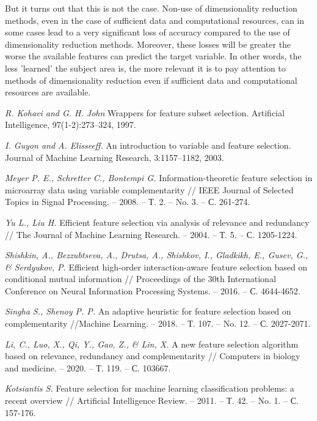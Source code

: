 \documentclass[12pt]{a&t}
\begin{document}
But it turns out that this is not the case. Non-use of dimensionality reduction methods, even in the case of sufficient data and computational resources, can in some cases lead to a very significant loss of accuracy compared to the use of dimensionality reduction methods. Moreover, these losses will be greater the worse the available features can predict the target variable. In other words, the less 'learned' the subject area is, the more relevant it is to pay attention to methods of dimensionality reduction even if sufficient data and computational resources are available.


\begin{thebibliography}{10}

{\it R. Kohavi and G. H. John}
Wrappers for feature subset selection. Artificial Intelligence, 97(1-2):273–324, 1997.

{\it I. Guyon and A. Elisseeff.}
An introduction to variable and feature selection. Journal of Machine Learning Research, 3:1157–1182, 2003.

{\it Meyer P. E., Schretter C., Bontempi G.}
Information-theoretic feature selection in microarray data using variable complementarity // IEEE Journal of Selected Topics in Signal Processing. – 2008. – Т. 2. – No. 3. – С. 261-274.

{\it Yu L., Liu H.}
Efficient feature selection via analysis of relevance and redundancy // The Journal of Machine Learning Research. – 2004. – Т. 5. – С. 1205-1224.

{\it Shishkin, A., Bezzubtseva, A., Drutsa, A., Shishkov, I., Gladkikh, E., Gusev, G., & Serdyukov, P.}
Efficient high-order interaction-aware feature selection based on conditional mutual information // Proceedings of the 30th International Conference on Neural Information Processing Systems. – 2016. – С. 4644-4652.

{\it Singha S., Shenoy P. P.}
An adaptive heuristic for feature selection based on complementarity //Machine Learning. – 2018. – Т. 107. – No. 12. – С. 2027-2071.

\bibitem{}
{\it Li, C., Luo, X., Qi, Y., Gao, Z., & Lin, X.}
A new feature selection algorithm based on relevance, redundancy and complementarity // Computers in biology and medicine. – 2020. – Т. 119. – С. 103667.

\bibitem{}
{\it Kotsiantis S.}
Feature selection for machine learning classification problems: a recent overview // Artificial Intelligence Review. – 2011. – Т. 42. – No. 1. – С. 157-176.


\end{thebibliography}
\end{document}
